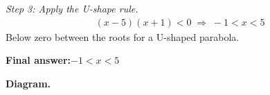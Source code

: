 \documentclass[11pt]{article}
\begin{document}
\textit{Step 3: Apply the U-shape rule.}
\[\begin{gathered}
(x - 5)(x + 1) < 0 \;\Longrightarrow\; -1 < x < 5
\end{gathered}\]
Below zero between the roots for a U-shaped parabola.

\begin{answerbox}
\textbf{Final answer:}\quad \(\displaystyle -1 < x < 5\)
\end{answerbox}
\textbf{Diagram.}

\begin{center}
\end{center}
\end{document}
